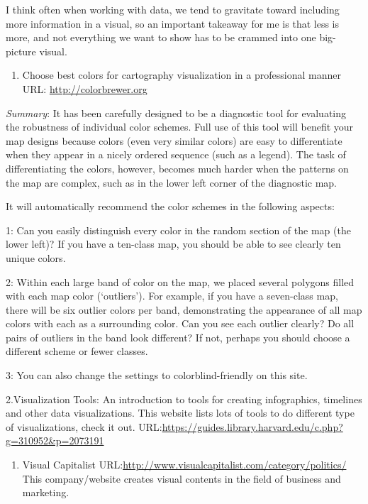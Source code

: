 \documentclass[]{book}
\providecommand{\tightlist}{%
  \setlength{\itemsep}{0pt}\setlength{\parskip}{0pt}}
\theoremstyle{definition}
\theoremstyle{definition}
\theoremstyle{definition}
\theoremstyle{remark}
\begin{document}
I think often when working with data, we tend to gravitate toward
including more information in a visual, so an important takeaway for me
is that less is more, and not everything we want to show has to be
crammed into one big-picture visual.

\begin{enumerate}
\def\labelenumi{\arabic{enumi}.}
\setcounter{enumi}{1}
\tightlist
\item
  Choose best colors for cartography visualization in a professional
  manner URL: \url{http://colorbrewer.org}
\end{enumerate}

\emph{Summary}: It has been carefully designed to be a diagnostic tool
for evaluating the robustness of individual color schemes. Full use of
this tool will benefit your map designs because colors (even very
similar colors) are easy to differentiate when they appear in a nicely
ordered sequence (such as a legend). The task of differentiating the
colors, however, becomes much harder when the patterns on the map are
complex, such as in the lower left corner of the diagnostic map.

It will automatically recommend the color schemes in the following
aspects:

1: Can you easily distinguish every color in the random section of the
map (the lower left)? If you have a ten-class map, you should be able to
see clearly ten unique colors.

2: Within each large band of color on the map, we placed several
polygons filled with each map color (`outliers'). For example, if you
have a seven-class map, there will be six outlier colors per band,
demonstrating the appearance of all map colors with each as a
surrounding color. Can you see each outlier clearly? Do all pairs of
outliers in the band look different? If not, perhaps you should choose a
different scheme or fewer classes.

3: You can also change the settings to colorblind-friendly on this site.

2.Visualization Tools: An introduction to tools for creating
infographics, timelines and other data visualizations. This website
lists lots of tools to do different type of visualizations, check it
out.
URL:\url{https://guides.library.harvard.edu/c.php?g=310952\&p=2073191}

\begin{enumerate}
\def\labelenumi{\arabic{enumi}.}
\setcounter{enumi}{2}
\tightlist
\item
  Visual Capitalist
  URL:\url{http://www.visualcapitalist.com/category/politics/} This
  company/website creates visual contents in the field of business and
  marketing.
\end{enumerate}
\end{document}

